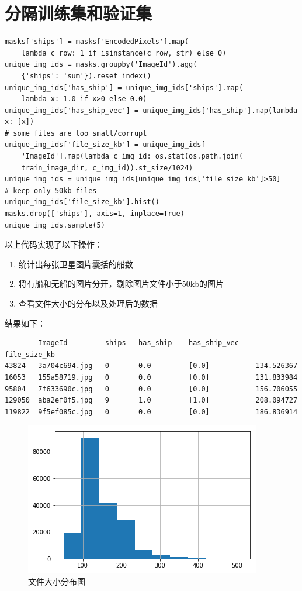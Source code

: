\section{分隔训练集和验证集}

\begin{lstlisting}
masks['ships'] = masks['EncodedPixels'].map(
    lambda c_row: 1 if isinstance(c_row, str) else 0)
unique_img_ids = masks.groupby('ImageId').agg(
    {'ships': 'sum'}).reset_index()
unique_img_ids['has_ship'] = unique_img_ids['ships'].map(
    lambda x: 1.0 if x>0 else 0.0)
unique_img_ids['has_ship_vec'] = unique_img_ids['has_ship'].map(lambda x: [x])
# some files are too small/corrupt
unique_img_ids['file_size_kb'] = unique_img_ids[
    'ImageId'].map(lambda c_img_id: os.stat(os.path.join(
    train_image_dir, c_img_id)).st_size/1024)
unique_img_ids = unique_img_ids[unique_img_ids['file_size_kb']>50]
# keep only 50kb files
unique_img_ids['file_size_kb'].hist()
masks.drop(['ships'], axis=1, inplace=True)
unique_img_ids.sample(5)
\end{lstlisting}

以上代码实现了以下操作：

\begin{enumerate}
\def\labelenumi{\arabic{enumi}.}
\tightlist
\item
  统计出每张卫星图片囊括的船数
\item
  将有船和无船的图片分开，剔除图片文件小于50kb的图片
\item
  查看文件大小的分布以及处理后的数据
\end{enumerate}

结果如下：

\begin{verbatim}
        ImageId         ships   has_ship    has_ship_vec    file_size_kb
43824   3a704c694.jpg   0       0.0         [0.0]           134.526367
16053   155a58719.jpg   0       0.0         [0.0]           131.833984
95804   7f633690c.jpg   0       0.0         [0.0]           156.706055
129050  aba2ef0f5.jpg   9       1.0         [1.0]           208.094727
119822  9f5ef085c.jpg   0       0.0         [0.0]           186.836914
\end{verbatim}

\begin{figure}
\centering
\includegraphics[width=0.7\linewidth]{body/preprocessing_pic/3}
\caption{文件大小分布图}
\label{fig::preprocessing3}
\end{figure}


